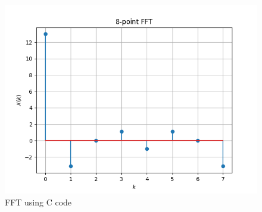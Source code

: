 \documentclass[journal,12pt,twocolumn]{IEEEtran}
\renewcommand\thesection{\arabic{section}}
\begin{document}
\begin{enumerate}[label=\arabic*.,ref=\thesection.\theenumi]
\begin{figure}[!ht]
      \includegraphics[width = \columnwidth]{figs/xk8pointFFT.png}
      \centering
      \caption{FFT using C code}
      \label{DFT_fft}
    \end{figure}
     \end{enumerate}
\end{document}

